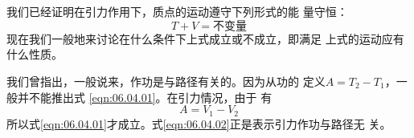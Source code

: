 \documentclass[../outline-of-mechanics.tex]{subfiles}
\begin{document}
\section[保守力]{}\label{sec:06.04}

我们已经证明在引力作用下，质点的运动遵守下列形式的能
量守恒：
\begin{equation}\label{eqn:06.04.01}
  T + V = \text{不变量}
\end{equation}
现在我们一般地来讨论在什么条件下上式成立或不成立，即满足
上式的运动应有什么性质。

我们曾指出，一般说来，作功是与路径有关的。因为从功的
定义$ A = T _ { 2 } - T _ { 1 } $，一般并不能推出式 \eqref{eqn:06.04.01}。在引力情况，由于
有
\begin{equation}\label{eqn:06.04.02}
  A = V _ { 1 } - V _ { 2 }
\end{equation}
所以式\eqref{eqn:06.04.01}才成立。式\eqref{eqn:06.04.02}正是表示引力作功与路径无
关。
\end{document}
